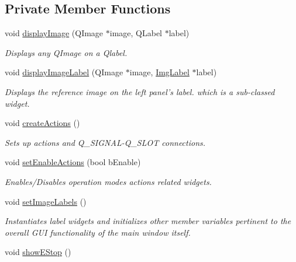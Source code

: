 \subsection*{Private Member Functions}
\begin{DoxyCompactItemize}
\item 
void \hyperlink{classQcorr_a925b0715143a0afa981851547f8b9256}{displayImage} (QImage $\ast$image, QLabel $\ast$label)
\begin{DoxyCompactList}\small\item\em Displays any QImage on a Qlabel. \item\end{DoxyCompactList}\item 
void \hyperlink{classQcorr_afddb022a6024a32be3b47016308d6c50}{displayImageLabel} (QImage $\ast$image, \hyperlink{classImgLabel}{ImgLabel} $\ast$label)
\begin{DoxyCompactList}\small\item\em Displays the reference image on the left panel's label. which is a sub-\/classed widget. \item\end{DoxyCompactList}\item 
\hypertarget{classQcorr_a54af608880477563fa8ebcb0d066b447}{
void \hyperlink{classQcorr_a54af608880477563fa8ebcb0d066b447}{createActions} ()}
\label{classQcorr_a54af608880477563fa8ebcb0d066b447}

\begin{DoxyCompactList}\small\item\em Sets up actions and Q\_\-SIGNAL-\/Q\_\-SLOT connections. \item\end{DoxyCompactList}\item 
void \hyperlink{classQcorr_a2de6d6969bdf48b225acc5ebbae063f7}{setEnableActions} (bool bEnable)
\begin{DoxyCompactList}\small\item\em Enables/Disables operation modes actions related widgets. \item\end{DoxyCompactList}\item 
\hypertarget{classQcorr_a17beb7cf946cdd82f587e3b4e5ee7f19}{
void \hyperlink{classQcorr_a17beb7cf946cdd82f587e3b4e5ee7f19}{setImageLabels} ()}
\label{classQcorr_a17beb7cf946cdd82f587e3b4e5ee7f19}

\begin{DoxyCompactList}\small\item\em Instantiates label widgets and initializes other member variables pertinent to the overall GUI functionality of the main window itself. \item\end{DoxyCompactList}\item 
\hypertarget{classQcorr_a78c77e6843a6413dbf2de14ecfd4d1d8}{
void \hyperlink{classQcorr_a78c77e6843a6413dbf2de14ecfd4d1d8}{showEStop} ()}
\label{classQcorr_a78c77e6843a6413dbf2de14ecfd4d1d8}


\end{DoxyCompactItemize}
